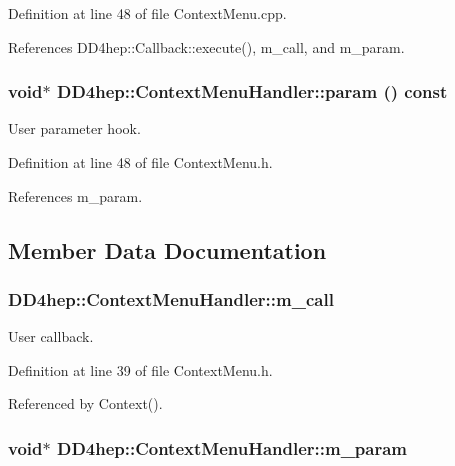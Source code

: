 Definition at line 48 of file ContextMenu.cpp.

References DD4hep::Callback::execute(), m\_\-call, and m\_\-param.\hypertarget{class_d_d4hep_1_1_context_menu_handler_ac34675679b67f4aa59066f09854d5ce4}{
\subsubsection[{param}]{\setlength{\rightskip}{0pt plus 5cm}void$\ast$ DD4hep::ContextMenuHandler::param () const}}
\label{class_d_d4hep_1_1_context_menu_handler_ac34675679b67f4aa59066f09854d5ce4}


User parameter hook. 

Definition at line 48 of file ContextMenu.h.

References m\_\-param.

\subsection{Member Data Documentation}
\hypertarget{class_d_d4hep_1_1_context_menu_handler_a28f1c56b0623ef052bb8647004acc5a7}{
\subsubsection[{m\_\-call}]{ {\bf DD4hep::ContextMenuHandler::m\_\-call}}}
\label{class_d_d4hep_1_1_context_menu_handler_a28f1c56b0623ef052bb8647004acc5a7}


User callback. 

Definition at line 39 of file ContextMenu.h.

Referenced by Context().\hypertarget{class_d_d4hep_1_1_context_menu_handler_a87e20729498769077b9fb5a668fdf410}{
\subsubsection[{m\_\-param}]{\setlength{\rightskip}{0pt plus 5cm}void$\ast$ {\bf DD4hep::ContextMenuHandler::m\_\-param}}}
\label{class_d_d4hep_1_1_context_menu_handler_a87e20729498769077b9fb5a668fdf410}


